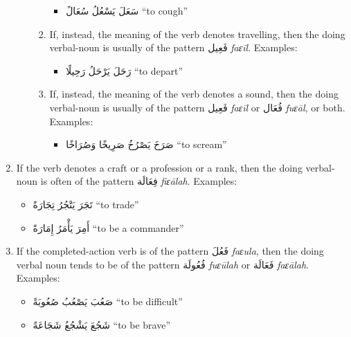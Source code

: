 \documentclass[
  10pt,
]{book}
\providecommand{\tightlist}{%
  \setlength{\itemsep}{0pt}\setlength{\parskip}{0pt}}
\begin{document}
\begin{enumerate}
\begin{enumerate}
\begin{enumerate}
      \begin{itemize}
      \tightlist
      \item
        \foreignlanguage{arabic}{سَعَلَ يَسْعُلُ سُعَالً} \enquote{to cough}
      \end{itemize}
    \item
      If, instead, the meaning of the verb denotes travelling, then the doing verbal-noun is usually of the pattern \foreignlanguage{arabic}{فَعِيل} \emph{faɛīl}. Examples:

      \begin{itemize}
      \tightlist
      \item
        \foreignlanguage{arabic}{رَحَلَ يَرْحَلُ رَحِيلًا} \enquote{to depart}
      \end{itemize}
    \item
      If, instead, the meaning of the verb denotes a sound, then the doing verbal-noun is usually of the pattern \foreignlanguage{arabic}{فَعِيل} \emph{faɛīl} or \foreignlanguage{arabic}{فُعَال} \emph{fuɛāl}, or both. Examples:

      \begin{itemize}
      \tightlist
      \item
        \foreignlanguage{arabic}{صَرَخَ يَصْرُخُ صَرِيخًا وَصُرَاخًا} \enquote{to scream}
      \end{itemize}
    \end{enumerate}
  \end{enumerate}
\item
  If the verb denotes a craft or a profession or a rank, then the doing verbal-noun is often of the pattern \foreignlanguage{arabic}{فِعَالَة} \emph{fiɛālah}. Examples:

  \begin{itemize}
  \tightlist
  \item
    \foreignlanguage{arabic}{تَجَرَ يَتْجُرُ تِجَارَةً} \enquote{to trade}
  \item
    \foreignlanguage{arabic}{أَمِرَ يَأْمَرُ إِمَارَةً} \enquote{to be a commander}
  \end{itemize}
\item
  If the completed-action verb is of the pattern \foreignlanguage{arabic}{فَعُلَ} \emph{faɛula}, then the doing verbal noun tends to be of the pattern \foreignlanguage{arabic}{فُعُولَة} \emph{fuɛūlah} or \foreignlanguage{arabic}{فَعَالَة} \emph{faɛālah}. Examples:

  \begin{itemize}
  \tightlist
  \item
    \foreignlanguage{arabic}{صَعُبَ يَصْعُبُ صُعُوبَةً} \enquote{to be difficult}
  \item
    \foreignlanguage{arabic}{شَجُعَ يَشْجُعُ شَجَاعَةً} \enquote{to be brave}
  \end{itemize}
\end{enumerate}
\end{document}
